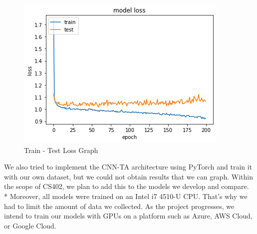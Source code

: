 \documentclass{article}
\begin{document}
\begin{figure}[H]
    \begin{center}
        \includegraphics[scale=0.6]{assets/graphs/loss_vt.png}
        \caption{Train - Test Loss Graph}
    \end{center}
\end{figure}
\noindent
We also tried to implement the CNN-TA architecture using PyTorch and train it with our own dataset, but we could not obtain results that we can graph. Within the scope of CS402, we plan to add this to the models we develop and compare.\vspace{0.2cm} \\*
Moreover, all models were trained on an Intel i7 4510-U CPU. That's why we had to limit the amount of data we collected. \newline
As the project progresses, we intend to train our models with GPUs on a platform such as Azure, AWS Cloud, or Google Cloud.
\end{document}

